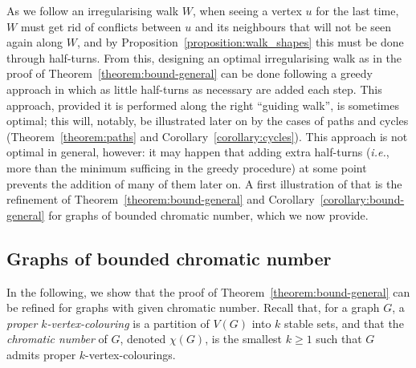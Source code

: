 \documentclass[a4paper,11pt,dvipsnames]{elsarticle}
\newcommand{\commenttext}[1]{ \begin{center} {\fbox{\begin{minipage}[h]{0.9 \linewidth}   {\textsf{ #1}} \end{minipage} }} \end{center}}
\newcommand{\Sam}[1]{{\color{red}\commenttext{Sam : #1}}}
\newcommand{\sam}[1]{\todo[size=\tiny,color=red!20!white]{\textbf{Sam:} #1}}
\newcommand{\rom}[1]{\todo[size=\tiny,color=blue!20!white]{\textbf{Rom:} #1}}
\newcommand{\Sam}[1]{}
\newcommand{\sam}[1]{}
\newcommand{\rom}[1]{}
\begin{document}
 As we follow an irregularising walk $W$, when seeing a vertex $u$ for the last time, $W$ must get rid of conflicts between $u$ and its neighbours that will not be seen again along $W$, and by Proposition~\ref{proposition:walk_shapes} this must be done through half-turns.
 From this, designing an optimal irregularising walk as in the proof of Theorem~\ref{theorem:bound-general} can be done following a greedy approach in which as little half-turns as necessary are added each step. This approach, provided it is performed along the right ``guiding walk'', is sometimes optimal; this will, notably, be illustrated later on by the cases of paths and cycles (Theorem~\ref{theorem:paths} and Corollary~\ref{corollary:cycles}). This approach is not optimal in general, however: it may happen that adding extra half-turns (\textit{i.e.}, more than the minimum sufficing in the greedy procedure) at some point prevents%
 the addition of many of them later on. A first illustration of that is the refinement of Theorem~\ref{theorem:bound-general} and Corollary~\ref{corollary:bound-general} for graphs of bounded chromatic number, which we now provide.

\subsection{Graphs of bounded chromatic number}

In the following, we show that the proof of Theorem~\ref{theorem:bound-general} can be refined for graphs with given chromatic number. Recall that, for a graph $G$, a \textit{proper $k$-vertex-colouring} is a partition of $V(G)$ into $k$ stable sets, and that the \textit{chromatic number} of $G$, denoted $\chi(G)$, is the smallest $k \geq 1$ such that $G$ admits proper $k$-vertex-colourings.
\end{document}
